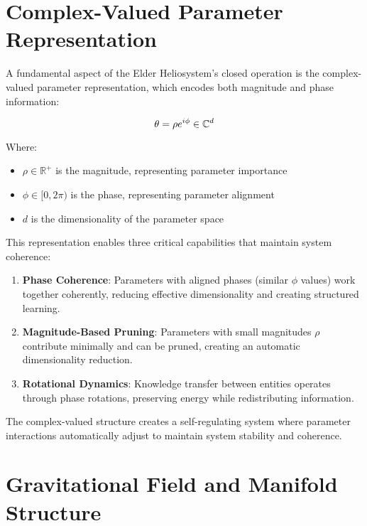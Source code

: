 \section{Complex-Valued Parameter Representation}

A fundamental aspect of the Elder Heliosystem's closed operation is the complex-valued parameter representation, which encodes both magnitude and phase information:

\begin{equation}
\theta = \rho e^{i\phi} \in \mathbb{C}^{d}
\end{equation}

Where:
\begin{itemize}
    \item $\rho \in \mathbb{R}^+$ is the magnitude, representing parameter importance
    \item $\phi \in [0, 2\pi)$ is the phase, representing parameter alignment
    \item $d$ is the dimensionality of the parameter space
\end{itemize}

This representation enables three critical capabilities that maintain system coherence:

\begin{enumerate}
    \item \textbf{Phase Coherence}: Parameters with aligned phases (similar $\phi$ values) work together coherently, reducing effective dimensionality and creating structured learning.
    
    \item \textbf{Magnitude-Based Pruning}: Parameters with small magnitudes $\rho$ contribute minimally and can be pruned, creating an automatic dimensionality reduction.
    
    \item \textbf{Rotational Dynamics}: Knowledge transfer between entities operates through phase rotations, preserving energy while redistributing information.
\end{enumerate}

The complex-valued structure creates a self-regulating system where parameter interactions automatically adjust to maintain system stability and coherence.

\section{Gravitational Field and Manifold Structure}

